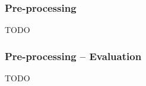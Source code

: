 \begin{frame}
    \frametitle{Pre-processing}
 TODO
\end{frame}
\clearpage

\begin{frame}
    \frametitle{Pre-processing -- Evaluation}
 TODO
\end{frame}
\clearpage